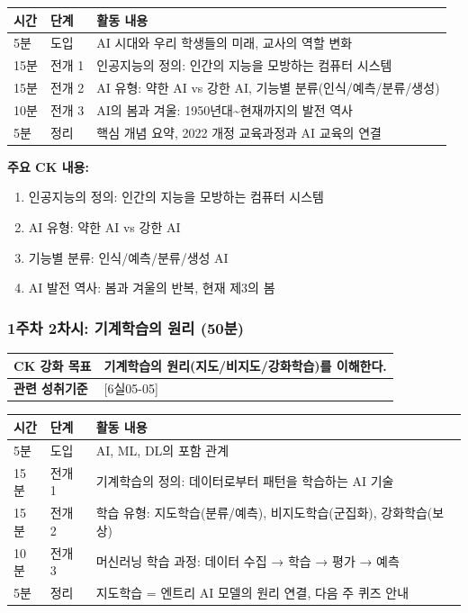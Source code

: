 \documentclass[a4paper,11pt]{article}
\begin{document}
\vspace{0.3em}\noindent
\begin{tabularx}{\textwidth}{|>{\centering\arraybackslash}p{1cm}|>{\centering\arraybackslash}p{1.5cm}|X|}
\hline
\textbf{시간} & \textbf{단계} & \textbf{활동 내용} \\ \hline
5분 & 도입 & AI 시대와 우리 학생들의 미래, 교사의 역할 변화 \\ \hline
15분 & 전개 1 & 인공지능의 정의: 인간의 지능을 모방하는 컴퓨터 시스템 \\ \hline
15분 & 전개 2 & AI 유형: 약한 AI vs 강한 AI, 기능별 분류(인식/예측/분류/생성) \\ \hline
10분 & 전개 3 & AI의 봄과 겨울: 1950년대\textasciitilde{}현재까지의 발전 역사 \\ \hline
5분 & 정리 & 핵심 개념 요약, 2022 개정 교육과정과 AI 교육의 연결 \\ \hline
\end{tabularx}

\textbf{주요 CK 내용:}
\begin{enumerate}[nosep,start=1]
\item 인공지능의 정의: 인간의 지능을 모방하는 컴퓨터 시스템
\item AI 유형: 약한 AI vs 강한 AI
\item 기능별 분류: 인식/예측/분류/생성 AI
\item AI 발전 역사: 봄과 겨울의 반복, 현재 제3의 봄
\end{enumerate}

\subsubsection{1주차 2차시: 기계학습의 원리 (50분)}

\noindent
\begin{tabularx}{\textwidth}{|>{\bfseries\arraybackslash}p{2.5cm}|X|}
\hline
CK 강화 목표 & 기계학습의 원리(지도/비지도/강화학습)를 이해한다. \\ \hline
관련 성취기준 & {[6실05-05]} \\ \hline
\end{tabularx}

\vspace{0.3em}\noindent
\begin{tabularx}{\textwidth}{|>{\centering\arraybackslash}p{1cm}|>{\centering\arraybackslash}p{1.5cm}|X|}
\hline
\textbf{시간} & \textbf{단계} & \textbf{활동 내용} \\ \hline
5분 & 도입 & AI, ML, DL의 포함 관계 \\ \hline
15분 & 전개 1 & 기계학습의 정의: 데이터로부터 패턴을 학습하는 AI 기술 \\ \hline
15분 & 전개 2 & 학습 유형: 지도학습(분류/예측), 비지도학습(군집화), 강화학습(보상) \\ \hline
10분 & 전개 3 & 머신러닝 학습 과정: 데이터 수집 → 학습 → 평가 → 예측 \\ \hline
5분 & 정리 & 지도학습 = 엔트리 AI 모델의 원리 연결, 다음 주 퀴즈 안내 \\ \hline
\end{tabularx}
\end{document}
